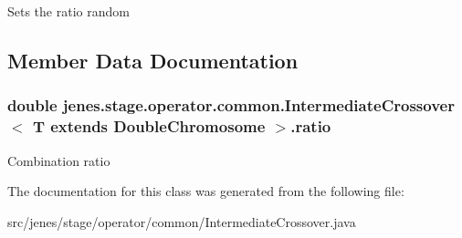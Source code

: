 Sets the ratio random 

\subsection{Member Data Documentation}
\hypertarget{classjenes_1_1stage_1_1operator_1_1common_1_1_intermediate_crossover_3_01_t_01extends_01_double_chromosome_01_4_00aeef350858cb4ee81f06f7cf7a4c06}{
\subsubsection[ratio]{\setlength{\rightskip}{0pt plus 5cm}double jenes.stage.operator.common.IntermediateCrossover$<$ T extends {\bf DoubleChromosome} $>$.{\bf ratio}}}
\label{classjenes_1_1stage_1_1operator_1_1common_1_1_intermediate_crossover_3_01_t_01extends_01_double_chromosome_01_4_00aeef350858cb4ee81f06f7cf7a4c06}


Combination ratio 

The documentation for this class was generated from the following file:\begin{CompactItemize}
\item 
src/jenes/stage/operator/common/IntermediateCrossover.java\end{CompactItemize}
